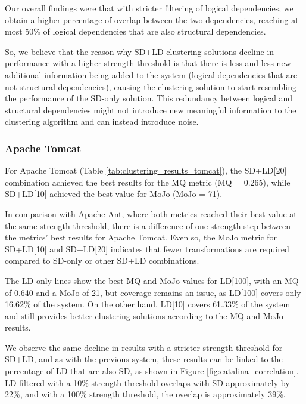 \documentclass{ieeeaccess}
\begin{document}
Our overall findings were that with stricter filtering of logical dependencies, we obtain a higher percentage of overlap between the two dependencies, reaching at most 50\% of logical dependencies that are also structural dependencies.

So, we believe that the reason why SD+LD clustering solutions decline in performance with a higher strength threshold is that there is less and less new additional information being added to the system (logical dependencies that are not structural dependencies), causing the clustering solution to start resembling the performance of the SD-only solution. This redundancy between logical and structural dependencies might not introduce new meaningful information to the clustering algorithm and can instead introduce noise.


\subsubsection{Apache Tomcat}

For Apache Tomcat (Table \ref{tab:clustering_results_tomcat}), the SD+LD[20] combination achieved the best results for the MQ metric (MQ = 0.265), while SD+LD[10] achieved the best value for MoJo (MoJo = 71).

In comparison with Apache Ant, where both metrics reached their best value at the same strength threshold, there is a difference of one strength step between the metrics' best results for Apache Tomcat. Even so, the MoJo metric for SD+LD[10] and SD+LD[20] indicates that fewer transformations are required compared to SD-only or other SD+LD combinations.

The LD-only lines show the best MQ and MoJo values for LD[100], with an MQ of 0.640 and a MoJo of 21, but coverage remains an issue, as LD[100] covers only 16.62\% of the system. On the other hand, LD[10] covers 61.33\% of the system and still provides better clustering solutions according to the MQ and MoJo results.

We observe the same decline in results with a stricter strength threshold for SD+LD, and as with the previous system, these results can be linked to the percentage of LD that are also SD, as shown in Figure \ref{fig:catalina_correlation}. LD filtered with a 10\% strength threshold overlaps with SD approximately by 22\%, and with a 100\% strength threshold, the overlap is approximately 39\%.
\end{document}
